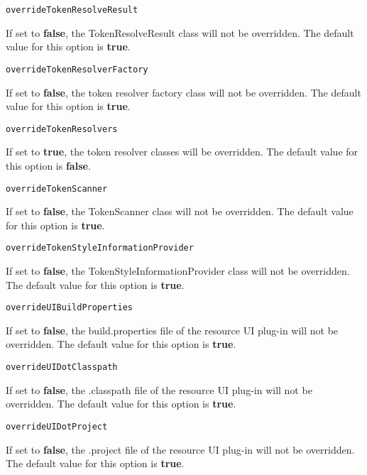 \noindent\texttt{overrideTokenResolveResult}
\begin{myindentpar}{1cm}
If set to \textbf{false}, the TokenResolveResult class will not be overridden. The default value for this option is \textbf{true}.
\end{myindentpar}

\noindent\texttt{overrideTokenResolverFactory}
\begin{myindentpar}{1cm}
If set to \textbf{false}, the token resolver factory class will not be overridden. The default value for this option is \textbf{true}.
\end{myindentpar}

\noindent\texttt{overrideTokenResolvers}
\begin{myindentpar}{1cm}
If set to \textbf{true}, the token resolver classes will be overridden. The default value for this option is \textbf{false}.
\end{myindentpar}

\noindent\texttt{overrideTokenScanner}
\begin{myindentpar}{1cm}
If set to \textbf{false}, the TokenScanner class will not be overridden. The default value for this option is \textbf{true}.
\end{myindentpar}

\noindent\texttt{overrideTokenStyleInformationProvider}
\begin{myindentpar}{1cm}
If set to \textbf{false}, the TokenStyleInformationProvider class will not be overridden. The default value for this option is \textbf{true}.
\end{myindentpar}

\noindent\texttt{overrideUIBuildProperties}
\begin{myindentpar}{1cm}
If set to \textbf{false}, the build.properties file of the resource UI plug-in will not be overridden. The default value for this option is \textbf{true}.
\end{myindentpar}

\noindent\texttt{overrideUIDotClasspath}
\begin{myindentpar}{1cm}
If set to \textbf{false}, the .classpath file of the resource UI plug-in will not be overridden. The default value for this option is \textbf{true}.
\end{myindentpar}

\noindent\texttt{overrideUIDotProject}
\begin{myindentpar}{1cm}
If set to \textbf{false}, the .project file of the resource UI plug-in will not be overridden. The default value for this option is \textbf{true}.
\end{myindentpar}


